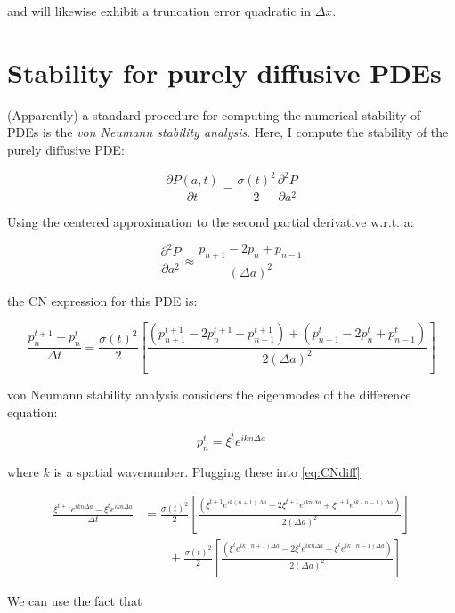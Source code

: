 \documentclass[12pt]{article}
\newcommand{\be}{\begin{equation}}
\newcommand{\ee}{\end{equation}}
\begin{document}
and will likewise exhibit a truncation error quadratic in $\Delta x$.


\section{Stability for purely diffusive PDEs}

(Apparently) a standard procedure for computing the numerical stability of PDEs is the \emph{von Neumann stability analysis}. Here, I compute the stability of the purely diffusive PDE:

\be
\frac{\partial P(a,t)}{\partial t} = \frac{\sigma(t)^2}{2} \frac{\partial^2 P}{\partial a^2}
\ee

Using the centered approximation to the second partial derivative w.r.t. a:

\be
	\frac{\partial^2 P}{\partial a^2} \approx \frac{p_{n+1} - 2p_n + p_{n-1}}{{(\Delta a)}^2} 
\ee

the CN expression for this PDE is:

\be \label{eq:CNdiff}
\frac{p^{t+1}_n - p^{t}_n}{\Delta t} = \frac{\sigma(t)^2}{2} \left[ \frac{\left(p^{t+1}_{n+1} - 2p^{t+1}_n + p^{t+1}_{n-1}\right) + \left(p^{t}_{n+1} - 2p^{t}_n + p^{t}_{n-1}\right)}{2{\left(\Delta a\right)}^2} \right]	
\ee

von Neumann stability analysis considers the eigenmodes of the difference equation:

\be
	p^t_n = \xi^t e^{ikn\Delta a}
\ee

where $k$ is a spatial wavenumber. Plugging these into \ref{eq:CNdiff}

\begin{align} 
\frac{\xi^{t+1} e^{ikn\Delta a} - \xi^t e^{ikn\Delta a}}{\Delta t} &= \frac{\sigma(t)^2}{2} \left[ \frac{\left(\xi^{t+1} e^{ik(n+1)\Delta a} - 2\xi^{t+1} e^{ikn\Delta a} + \xi^{t+1} e^{ik(n-1)\Delta a}\right)}{2{\left(\Delta a\right)}^2} \right] \nonumber \\ 
	&\qquad {} + \frac{\sigma(t)^2}{2}  \left[ \frac{\left(\xi^t e^{ik(n+1)\Delta a} - 2\xi^t e^{ikn\Delta a} + \xi^t e^{ik(n-1)\Delta a}\right)}{2{\left(\Delta a\right)}^2} \right]
\end{align}

We can use the fact that 
\end{document}
